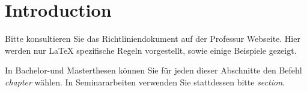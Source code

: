 \chapter{Introduction} \label{chap:introduction}
Bitte konsultieren Sie das Richtliniendokument auf der Professur Webseite. Hier werden nur LaTeX spezifische Regeln vorgestellt, sowie einige Beispiele gezeigt.

In Bachelor-und Masterthesen können Sie für jeden dieser Abschnitte den Befehl \emph{chapter} wählen. In Seminararbeiten verwenden Sie stattdessen bitte \emph{section}.

